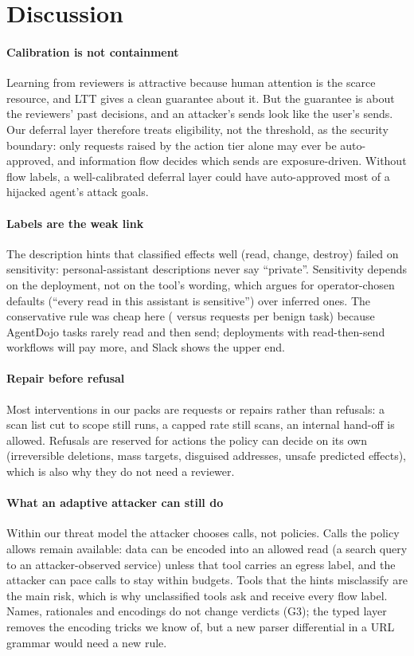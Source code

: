 \section{Discussion}
\label{sec:discussion}

\paragraph{Calibration is not containment}
Learning from reviewers is attractive because human attention is the scarce resource, and LTT gives a clean guarantee about it. But the guarantee is about the reviewers' past decisions, and an attacker's sends look like the user's sends. Our deferral layer therefore treats eligibility, not the threshold, as the security boundary: only requests raised by the action tier alone may ever be auto-approved, and information flow decides which sends are exposure-driven. Without flow labels, a well-calibrated deferral layer could have auto-approved most of a hijacked agent's attack goals.

\paragraph{Labels are the weak link}
The description hints that classified effects well (read, change, destroy) failed on sensitivity: personal-assistant descriptions never say ``private''. Sensitivity depends on the deployment, not on the tool's wording, which argues for operator-chosen defaults (``every read in this assistant is sensitive'') over inferred ones. The conservative rule was cheap here (\AdConsAsks{} versus \AdTiersAsks{} requests per benign task) because AgentDojo tasks rarely read and then send; deployments with read-then-send workflows will pay more, and Slack shows the upper end.

\paragraph{Repair before refusal}
Most interventions in our packs are requests or repairs rather than refusals: a scan list cut to scope still runs, a capped rate still scans, an internal hand-off is allowed. Refusals are reserved for actions the policy can decide on its own (irreversible deletions, mass targets, disguised addresses, unsafe predicted effects), which is also why they do not need a reviewer.

\paragraph{What an adaptive attacker can still do}
Within our threat model the attacker chooses calls, not policies. Calls the policy allows remain available: data can be encoded into an allowed read (a search query to an attacker-observed service) unless that tool carries an egress label, and the attacker can pace calls to stay within budgets. Tools that the hints misclassify are the main risk, which is why unclassified tools ask and receive every flow label. Names, rationales and encodings do not change verdicts (G3); the typed layer removes the encoding tricks we know of, but a new parser differential in a URL grammar would need a new rule.

